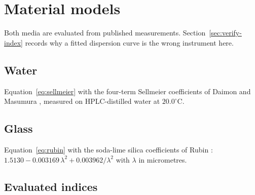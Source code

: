 \providecommand{\appendices}{\appendix}
\appendices
\section{Material models}
\label{app:material}

Both media are evaluated from published measurements. Section~\ref{sec:verify-index} records why a fitted dispersion curve is the wrong instrument here.

\subsection{Water}

Equation~\eqref{eq:sellmeier} with the four-term Sellmeier coefficients of
Daimon and Masumura \cite{daimon2007}, measured on HPLC-distilled water at
$20.0^\circ\text{C}$.

\subsection{Glass}

Equation~\eqref{eq:rubin} with the soda-lime silica coefficients of Rubin
\cite{rubin1985}: $1.5130 - 0.003169\,\lambda^2 + 0.003962/\lambda^2$ with
$\lambda$ in micrometres.

\subsection{Evaluated indices}

